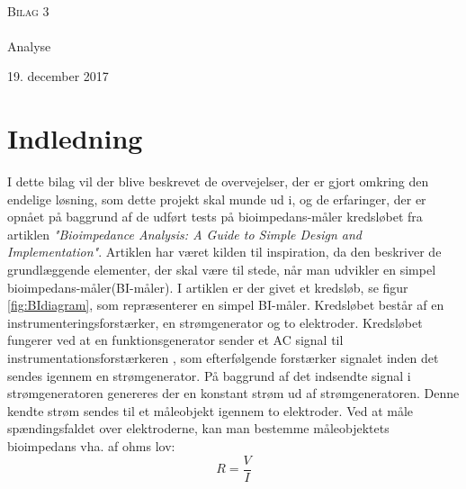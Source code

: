 



\begin{titlingpage}
\begin{center}

~ \\[3cm]


\textsc{\LARGE Bilag 3}\\[1.5cm]


\noindent\makebox[\linewidth]{\rule{\textwidth}{0.4pt}}\\
[0.5cm]{\Huge Analyse}
\noindent\makebox[\linewidth]{\rule{\textwidth}{0.4pt}}
\end{center}
\vfill
\begin{center}
{\large 19. december 2017}
\end{center}
\end{titlingpage}



\newpage
\tableofcontents*
\newpage


\chapter{Indledning}

I dette bilag vil der blive beskrevet de overvejelser, der er gjort omkring den endelige løsning, som dette projekt skal munde ud i, og de erfaringer, der er opnået på baggrund af de udført tests på bioimpedans-måler kredsløbet fra artiklen \textit{"Bioimpedance Analysis: A Guide to Simple Design and Implementation"}. Artiklen har været kilden til inspiration, da den beskriver de grundlæggende elementer, der skal være til stede, når man udvikler en simpel bioimpedans-måler(BI-måler). I artiklen er der givet et kredsløb, se figur \ref{fig:BIdiagram}, som repræsenterer en simpel BI-måler. Kredsløbet består af en instrumenteringsforstærker, en strømgenerator og to elektroder. Kredsløbet fungerer ved at en funktionsgenerator sender et AC signal til instrumentationsforstærkeren , som efterfølgende forstærker signalet inden det sendes igennem en strømgenerator. På baggrund af det indsendte signal i strømgeneratoren genereres der en konstant strøm ud af strømgeneratoren. Denne kendte strøm sendes til et måleobjekt igennem to elektroder. Ved at måle spændingsfaldet over elektroderne, kan man bestemme måleobjektets bioimpedans vha. af ohms lov: $$R=\frac{V}{I}$$

